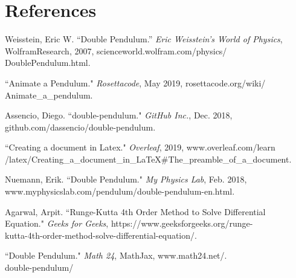 \documentclass[a4paper,12pt]{article}
\begin{document}
\medskip

\section*{References}

\noindent
Weisstein, Eric W. “Double Pendulum.” \textit{Eric Weisstein’s World of Physics},
\indent WolframResearch, 2007, scienceworld.wolfram.com/physics/ \\
\indent DoublePendulum.html.

\noindent
“Animate a Pendulum." \textit{Rosettacode}, May 2019, rosettacode.org/wiki/ \\
\indent Animate\_a\_pendulum.

\noindent
Assencio, Diego. “double-pendulum." \textit{GitHub Inc.}, Dec. 2018, \\
\indent github.com/dassencio/double-pendulum.

\noindent
“Creating a document in Latex." \textit{Overleaf}, 2019, www.overleaf.com/learn \\
\indent /latex/Creating\_a\_document\_in\_LaTeX\#The\_preamble\_of\_a\_document.

\noindent
Nuemann, Erik. “Double Pendulum." \textit{My Physics Lab}, Feb. 2018, \\
\indent www.myphysicslab.com/pendulum/double-pendulum-en.html.

\noindent
Agarwal, Arpit. “Runge-Kutta 4th Order Method to Solve Differential \\
\indent  Equation." \textit{Geeks for Geeks}, https://www.geeksforgeeks.org/runge- \\
\indent kutta-4th-order-method-solve-differential-equation/.


\noindent
“Double Pendulum." \textit{Math 24}, MathJax, www.math24.net/. \\
\indent double-pendulum/
\end{document}
